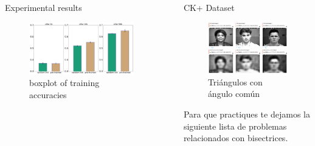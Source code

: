 \documentclass[final]{beamer}
\newlength{\sepwid}
\newlength{\onecolwid}
\begin{document}
\begin{frame}[t]
\begin{columns}[t]
\begin{column}{\onecolwid}
\begin{block}{Experimental results}
\begin{figure}
\includegraphics[width=\linewidth]{box_plots/boxplots_cifar.png}
\caption{boxplot of training accuracies}
\end{figure}

\end{block}

\end{column} %

\begin{column}{\sepwid}\end{column} %

\begin{column}{\onecolwid} %


\begin{block}{CK+ Dataset}
\begin{figure}

\includegraphics[width=0.8\linewidth]{graphics/ckplus_reconstructions_better.png}
\caption{Triángulos con ángulo común}
\end{figure}
Para que practiques te dejamos la siguiente lista de problemas relacionados con bisectrices.


\end{block}
\end{column}
\end{columns}
\end{frame}
\end{document}
